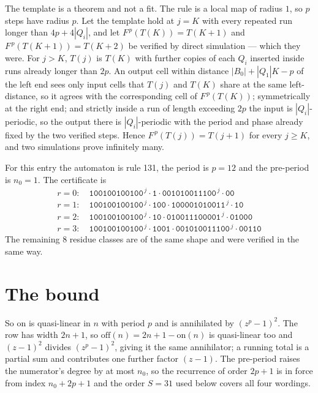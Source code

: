 \documentclass[11pt,a4paper]{article}
\theoremstyle{plain}
\theoremstyle{definition}
\begin{document}
The template is a theorem and not a fit. The rule is a local map of radius $1$, so $p$ steps
have radius $p$. Let the template hold at $j=K$ with every repeated run longer than
$4p+4|Q_i|$, and let $F^{\,p}(T(K))=T(K+1)$ and $F^{\,p}(T(K+1))=T(K+2)$ be verified by direct
simulation --- which they were. For $j>K$, $T(j)$ is $T(K)$ with further copies of each $Q_i$
inserted inside runs already longer than $2p$. An output cell within distance
$|B_0|+|Q_1|K-p$ of the left end sees only input cells that $T(j)$ and $T(K)$ share at the same
left-distance, so it agrees with the corresponding cell of $F^{\,p}(T(K))$; symmetrically at
the right end; and strictly inside a run of length exceeding $2p$ the input is
$|Q_i|$-periodic, so the output there is $|Q_i|$-periodic with the period and phase already
fixed by the two verified steps. Hence $F^{\,p}(T(j))=T(j+1)$ for every $j\ge K$, and two
simulations prove infinitely many.

For this entry the automaton is rule 131, the period is $p=12$ and the pre-period is $n_0=1$.
The certificate is
\begin{gather*}
r=0:\quad \texttt{100100100100}^{\,j} \cdot \texttt{1} \cdot \texttt{001010011100}^{\,j} \cdot \texttt{00} \\
r=1:\quad \texttt{100100100100}^{\,j} \cdot \texttt{100} \cdot \texttt{100001010011}^{\,j} \cdot \texttt{10} \\
r=2:\quad \texttt{100100100100}^{\,j} \cdot \texttt{10} \cdot \texttt{010011100001}^{\,j} \cdot \texttt{01000} \\
r=3:\quad \texttt{100100100100}^{\,j} \cdot \texttt{1001} \cdot \texttt{001010011100}^{\,j} \cdot \texttt{00110}
\end{gather*} The remaining 8 residue classes are of the same shape and were verified in the same way.

\section{The bound}

So $\mathrm{on}$ is quasi-linear in $n$ with period $p$ and is annihilated by
$(z^p-1)^2$. The row has width $2n+1$, so $\mathrm{off}(n)=2n+1-\mathrm{on}(n)$ is quasi-linear
too and $(z-1)^2$ divides $(z^p-1)^2$, giving it the same annihilator; a running total is a
partial sum and contributes one further factor $(z-1)$. The pre-period raises the numerator's
degree by at most $n_0$, so the recurrence of order $2p+1$ is in force from index $n_0+2p+1$
and the order $S=31$ used below covers all four wordings.
\end{document}

